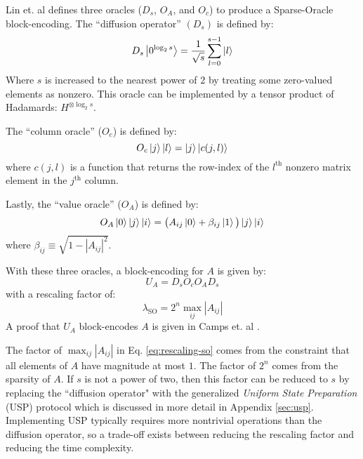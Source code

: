 Lin et. al \cite{lin2022lecture} defines three oracles ($D_s$, $O_A$, and $O_c$) to produce a Sparse-Oracle block-encoding.
The ``diffusion operator'' $(D_s)$ is defined by:
\begin{equation}
    \label{eq:diffusion}
    D_s \ket{0^{\log_2{s}}} = \frac{1}{\sqrt{s}} \sum_{l=0}^{s-1} \ket{l}
\end{equation}
Where $s$ is increased to the nearest power of $2$ by treating some zero-valued elements as nonzero.
This oracle can be implemented by a tensor product of Hadamards: $H^{\otimes \log_2{s}}$.

The ``column oracle'' ($O_c$) is defined by: 
\begin{equation}
    \label{eq:column-oracle}
    O_c \ket{j} \ket{l} = \ket{j}\ket{c(j, l)}
\end{equation}
where $c(j, l)$ is a function that returns the row-index of the $l^\text{th}$ nonzero matrix element in the $j^\text{th}$ column.

Lastly, the ``value oracle'' ($O_A$) is defined by:
\begin{equation}
    \label{eq:value-oracle}
    O_A \ket{0} \ket{j}\ket{i} = \big( A_{ij} \ket{0}  + \beta_{ij} \ket{1} \big) \ket{j}\ket{i}
\end{equation}
where $\beta_{ij} \equiv \sqrt{1 - |A_{ij}|^2}$.

With these three oracles, a block-encoding for $A$ is given by:
\begin{equation}
    \label{eq:so-be}
    U_A = D_s O_c O_A D_s
\end{equation}
with a rescaling factor of:
\begin{equation}
    \label{eq:rescaling-so}
    \lambda_\text{SO} = 2^n \max_{ij} {|A_{ij}|} 
\end{equation}
A proof that $U_A$ block-encodes $A$ is given in Camps et. al \cite{camps2024explicit}.

The factor of $\max_{ij} {|A_{ij}|}$ in Eq. \ref{eq:rescaling-so} comes from the constraint that all elements of $A$ have magnitude at most $1$.
The factor of $2^n$ comes from the sparsity of $A$.
If $s$ is not a power of two, then this factor can be reduced to $s$ by replacing the ``diffusion operator" with the generalized \textit{Uniform State Preparation} (USP) protocol which is discussed in more detail in Appendix \ref{sec:usp}.
Implementing USP typically requires more nontrivial operations than the diffusion operator, so a trade-off exists between reducing the rescaling factor and reducing the time complexity.

